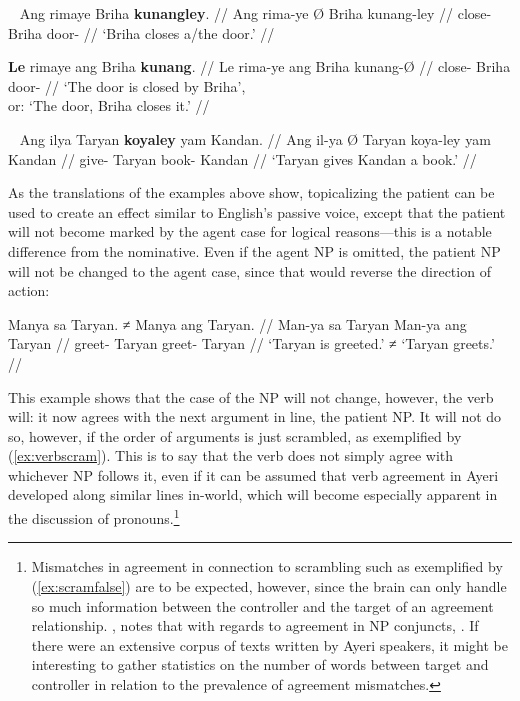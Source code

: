 \xe

\pex~
\a\begingl
	\gla Ang rimaye {} Briha \textbf{kunangley}. //
	\glb Ang rima-ye Ø Briha kunang-ley //
	\glc \AgtT{} close-\TsgF{} \Top{} Briha door-\PargI{} //
	\glft `Briha closes a/the door.' //
\endgl

\a\begingl
	\gla \textbf{Le} rimaye ang Briha \textbf{kunang}. //
	\glb Le rima-ye ang Briha kunang-Ø //
	\glc \PatTI{} close-\TsgF{} \Aarg{} Briha door-\Top{} //
	\glft `The door is closed by Briha',\\
		or: `The door, Briha closes it.' //
\endgl

\xe

\ex~
\begingl
	\gla Ang ilya {} Taryan \textbf{koyaley} yam Kandan. //
	\glb Ang il-ya Ø Taryan koya-ley yam Kandan //
	\glc \AgtT{} give-\TsgM{} \Top{} Taryan book-\PargI{} \Dat{} Kandan //
	\glft `Taryan gives Kandan a book.' //
\endgl

\xe

As the translations of the examples above show, topicalizing the patient can be
used to create an effect similar to English's passive voice, except that the
patient will not become marked by the agent case for logical reasons---this is
a notable difference from the nominative. Even if the agent NP is omitted, the
patient NP will not be changed to the agent case, since that would reverse the
direction of action:

\ex\begingl
	\gla Manya sa Taryan. ≠ Manya ang Taryan. //
	\glb Man-ya sa Taryan {} Man-ya ang Taryan //
	\glc greet-\TsgM{} \Parg{} Taryan {} greet-\TsgM{} \Aarg{} Taryan //
	\glft `Taryan is greeted.' ≠ `Taryan greets.' //
\endgl\xe

This example shows that the case of the NP will not change, however, the 
verb will: it now agrees with the next argument in line, the patient NP. It 
will not do so, however, if the order of arguments is just scrambled, as 
exemplified by (\ref{ex:verbscram}). This is to say that the verb does not 
simply agree with whichever NP follows it, even if it can be assumed that verb 
agreement in Ayeri developed along similar lines in-world, which will become 
especially apparent in the discussion of pronouns.\footnote{Mismatches in 
agreement in connection to scrambling such as exemplified by 
(\ref{ex:scramfalse}) are to be expected, however, since the brain can only 
handle so much information between the controller and the target of an 
agreement relationship. \citet{corbett2006}, notes that with regards to 
agreement in NP conjuncts, . If there were an extensive corpus of 
texts written by Ayeri speakers, it might be interesting to gather statistics 
on the number of words between target and controller in relation to the 
prevalence of agreement mismatches.}

